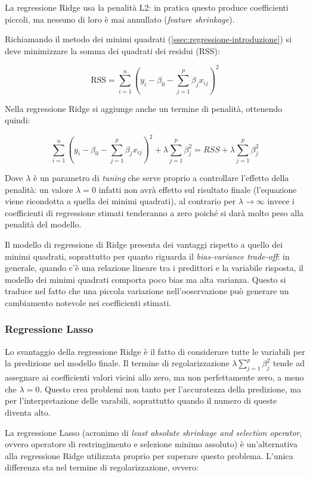 La regressione Ridge usa la penalità L2: in pratica questo produce coefficienti piccoli, ma nessuno di loro è mai annullato (\textit{feature shrinkage}).

Richiamando il metodo dei minimi quadrati (\ref{ssec:regressione-introduzione}) si deve minimizzare la somma dei quadrati dei residui (RSS):

$$\mathrm{RSS}=\sum_{i=1}^{n}\left(y_{i}-\beta_{0}-\sum_{j=1}^{p} \beta_{j} x_{i j}\right)^{2}$$\smallskip

Nella regressione Ridge si aggiunge anche un termine di penalità, ottenendo quindi:

$$\sum_{i=1}^{n}\left(y_{i}-\beta_{0}-\sum_{j=1}^{p} \beta_{j} x_{i j}\right)^{2}+\lambda \sum_{j=1}^{p} \beta_{j}^{2}=R S S+\lambda \sum_{j=1}^{p} \beta_{j}^{2}$$\smallskip

Dove $\lambda$ è un parametro di \textit{tuning} che serve proprio a controllare l’effetto della penalità: un valore $\lambda=0$ infatti non avrà effetto sul risultato finale (l’equazione viene ricondotta a quella dei minimi quadrati), al contrario per $\lambda \to \infty$ invece i coefficienti di regressione stimati tenderanno a zero poiché si darà molto peso alla penalità del modello. \cite{lasso_vs_ridge}

Il modello di regressione di Ridge presenta dei vantaggi rispetto a quello dei minimi quadrati, soprattutto per quanto riguarda il \textit{bias-variance trade-off}: in generale, quando c’è una relazione lineare tra i predittori e la variabile risposta, il modello dei minimi quadrati comporta poco bias ma alta varianza. Questo si traduce nel fatto che una piccola variazione nell'ooservazione può generare un cambiamento notevole nei coefficienti stimati. \cite{tesi_polito}

\subsubsection{Regressione Lasso}\label{sssec:regressione-lasso}
Lo svantaggio della regressione Ridge è il fatto di considerare tutte le variabili per la predizione nel modello finale. Il termine di regolarizzazione $\lambda \sum_{j=1}^{p} \beta_{j}^{2}$ tende ad assegnare ai coefficienti valori vicini allo zero, ma non perfettamente zero, a meno che $\lambda = 0$.
Questo crea problemi non tanto per l’accuratezza della predizione, ma per l’interpretazione delle varabili, soprattutto quando il numero di queste diventa alto.

La regressione Lasso (acronimo di \textit{least absolute shrinkage and selection operator}, ovvero operatore di restringimento e selezione minimo assoluto) è un’alternativa alla regressione Ridge utilizzata proprio per superare questo problema. L'unica differenza sta nel termine di regolarizzazione, ovvero:

